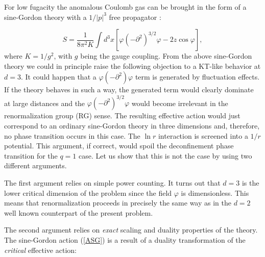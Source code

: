\documentclass[a4paper,showpacs,preprintnumbers,amsmath,amssymb,prl,twocolumn]{revtex4}
\begin{document}
For low fugacity the anomalous Coulomb gas can be brought in the form 
of a sine-Gordon theory with a $1/|p|^3$ free propagator 
\cite{KNS,KNS1}:

\begin{equation}
\label{ASG}
S=\frac{1}{8\pi^2K}
\int d^3 x[\varphi(-\partial^2)^{3/2}\varphi
-2z\cos\varphi], 
\end{equation}
where $K=1/g^2$, with $g$ being the gauge coupling. From the above sine-Gordon 
theory we could in principle raise the following objection to a KT-like behavior 
at $d=3$. It could happen that a $\varphi(-\partial^2)\varphi$ term is generated 
by fluctuation effects. If the theory behaves in such a way, the generated term 
would clearly dominate at large distances and the $\varphi(-\partial^2)^{3/2}\varphi$ 
would become irrelevant in the renormalization group (RG) sense. The resulting effective 
action would just correspond to an ordinary sine-Gordon theory in three dimensions and, 
therefore, no phase transition occurs in this case. The $\ln r$ interaction is screened 
into a $1/r$ potential. This argument, if correct, would spoil the deconfinement phase 
transition for the $q=1$ case. Let us show that this is not the case by using two 
different arguments. 

The first argument relies on simple 
power counting. It turns out that $d=3$ is the lower 
critical dimension of the problem since the field 
$\varphi$ is dimensionless. This means that renormalization 
proceeds in precisely the same way as in the $d=2$ well known 
counterpart of the present problem. 

The second argument relies 
on {\it exact} scaling and duality properties of the 
theory. The sine-Gordon action (\ref{ASG}) is a result of 
a duality transformation of the {\it critical} effective 
action:
\end{document}
